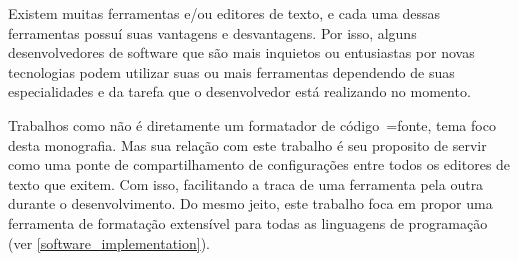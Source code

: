 Existem muitas ferramentas e\slash{}ou editores de texto,
e cada uma dessas ferramentas possuí suas vantagens e
desvantagens. Por isso,
alguns desenvolvedores de software que são mais inquietos ou
entusiastas por novas tecnologias podem utilizar suas ou
mais ferramentas dependendo de suas especialidades e
da tarefa que o desenvolvedor está realizando no momento.

Trabalhos como \cite{editorConfig} não é diretamente um formatador de código~=fonte,
tema foco desta monografia.
Mas sua relação com este trabalho é seu proposito de servir como uma ponte de compartilhamento de configurações entre todos os editores de texto que exitem.
Com isso,
facilitando a traca de uma ferramenta pela outra durante o desenvolvimento.
Do mesmo jeito,
este trabalho foca em propor uma ferramenta de formatação extensível para todas as linguagens de programação (ver \autoref{software_implementation}).

\cite{universalIndentGUI}

\cite{prettyPrintingOfVisualSentences}

\cite{anAbstractPrettyPrinter}

\cite{improvingRefactoringSpeed}


